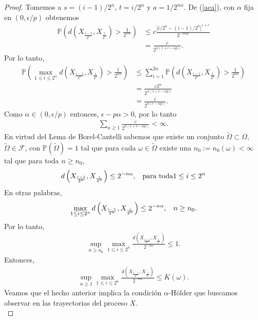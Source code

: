 \begin{proof}
Tomemos a $s = (i-1)/2^n$, $t = i/2^n$ y $a = 1/2^{n \alpha}$. De (\ref{aca}), con $\alpha$ fija en $(0, \epsilon / p)$ obtenemos
	\begin{align*}
	\mathbb{P} \left( d(X_{\frac{i-1}{2^n}}, X_{\frac{i}{2^n}}) > \frac{1}{2^{n \alpha}} \right) & \leq c \frac{| i/2^n - (i-1)/2^n|^{1+\epsilon}}{2^{- n \alpha p}} \\
	& = \frac{c}{2^{n(1 + \epsilon - \alpha p)}}.
	\end{align*}
Por lo tanto, 
	\begin{align*}
	\mathbb{P} \left( \max_{1 \leq i \leq 2^n} d(X_{\frac{i-1}{2^n}}, X_{\frac{i}{2^n}}) > \frac{1}{2^{n \alpha}} \right)  & \leq \sum_{i=1}^{2n} \mathbb{P} \left( d(X_{\frac{i-1}{2^n}}, X_{\frac{i}{2^n}}) > \frac{1}{2^{n \alpha}} \right) \\
	& = \frac{c2^n}{2^{n(1 + \epsilon - \alpha p)}} \\
	& = \frac{c}{2^{n(\epsilon - \alpha p)}}.
	\end{align*}
Como $\alpha \in (0, \epsilon / p)$ entonces, $\epsilon - p \alpha > 0$, por lo tanto
	\begin{align*}
	\sum_{n \geq 1} \frac{c}{2^{n(1 + \epsilon - \alpha p)}} < \infty.
	\end{align*}
En virtud del Lema de Borel-Cantelli sabemos que existe un conjunto $\tilde{\Omega} \subset \Omega$, $\tilde{\Omega} \in \mathcal{F}$, con $\mathbb{P} (\tilde{\Omega}) = 1$ tal que para cada $\omega \in \tilde{\Omega}$ existe una $n_0 := n_0 (\omega) < \infty$ tal que para toda $n \geq n_0$, 
	\begin{align}
	d \left(X_{\frac{i-1}{2^n}}, X_{\frac{i}{2^n}}\right) \leq 2^{-n \alpha}, \hspace{0.3cm} \text{para toda} 1 \leq i \leq 2^n \label{acb}
	\end{align}
En otras palabras, 
	\begin{align*}
	\max_{1 \leq i \leq 2^n} d \left(X_{\frac{i-1}{2^n}}, X_{\frac{i}{2^n}}\right) \leq 2^{-n \alpha}, \hspace{0.3cm} n \geq n_0.
	\end{align*}
Por lo tanto, 
	\begin{align*}
	\sup_{n \geq n_0} \max_{1 \leq i \leq 2^n} \frac{d \left(X_{\frac{i-1}{2^n}}, X_{\frac{i}{2^n}}\right)}{2^{-n \alpha}} \leq 1.
	\end{align*}
Entonces, 
	\begin{align*}
	\sup_{n \geq 1} \max_{1 \leq i \leq 2^n} \frac{d \left(X_{\frac{i-1}{2^n}}, X_{\frac{i}{2^n}}\right)}{2^{-n \alpha}} \leq K(\omega).
	\end{align*}
Veamos que el hecho anterior implica la condición $\alpha$-Hölder que buscamos observar en las trayectorias del proceso $X$. \\


\end{proof}
